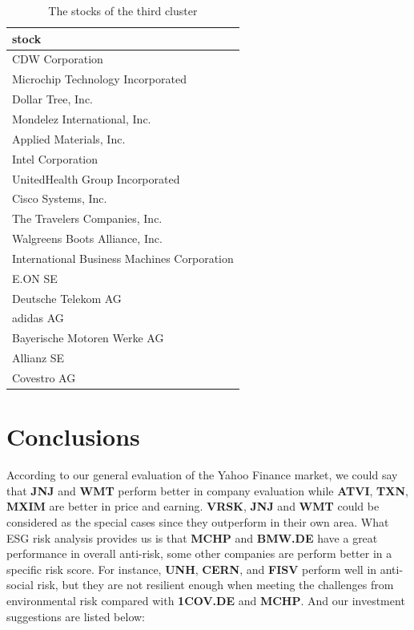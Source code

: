\documentclass[11pt,a4paper,]{article}
\begin{document}
\begin{table}

\caption{\label{tab:memb-three}The stocks of the third cluster}
\centering
\begin{tabular}[t]{l}
\hline
stock\\
\hline
CDW Corporation\\
\hline
Microchip Technology Incorporated\\
\hline
Dollar Tree, Inc.\\
\hline
Mondelez International, Inc.\\
\hline
Applied Materials, Inc.\\
\hline
Intel Corporation\\
\hline
UnitedHealth Group Incorporated\\
\hline
Cisco Systems, Inc.\\
\hline
The Travelers Companies, Inc.\\
\hline
Walgreens Boots Alliance, Inc.\\
\hline
International Business Machines Corporation\\
\hline
E.ON SE\\
\hline
Deutsche Telekom AG\\
\hline
adidas AG\\
\hline
Bayerische Motoren Werke AG\\
\hline
Allianz SE\\
\hline
Covestro AG\\
\hline
\end{tabular}
\end{table}

\hypertarget{conclusions}{%
\section{Conclusions}\label{conclusions}}

According to our general evaluation of the Yahoo Finance market, we could say that \textbf{JNJ} and \textbf{WMT} perform better in company evaluation while \textbf{ATVI}, \textbf{TXN}, \textbf{MXIM} are better in price and earning. \textbf{VRSK}, \textbf{JNJ} and \textbf{WMT} could be considered as the special cases since they outperform in their own area. What ESG risk analysis provides us is that \textbf{MCHP} and \textbf{BMW.DE} have a great performance in overall anti-risk, some other companies are perform better in a specific risk score. For instance, \textbf{UNH}, \textbf{CERN}, and \textbf{FISV} perform well in anti-social risk, but they are not resilient enough when meeting the challenges from environmental risk compared with \textbf{1COV.DE} and \textbf{MCHP}. And our investment suggestions are listed below:
\end{document}
